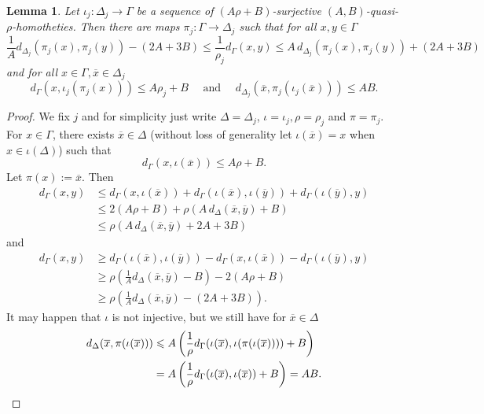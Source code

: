 \documentclass{amsart}
\newtheorem{lemma}[theorem]{Lemma}
\theoremstyle{definition}
\theoremstyle{remark}
\theoremstyle{remark}
\theoremstyle{definition}
\renewcommand{\leq}{\leqslant}
\renewcommand{\geq}{\geqslant}
\begin{document}
\begin{lemma} \label{lem:quasi-homothety-seq}
    Let $\iota_j \colon \Delta_j \to \Gamma$ be a sequence of $(A\rho+B)$-surjective $(A,B)$-quasi-$\rho$-homotheties. Then there are maps $\pi_j \colon \Gamma \to \Delta_j $ such that for all $x,y \in \Gamma$
     $$
    \frac{1}{A} d_{\Delta_j}(\pi_j(x),\pi_j(y)) - (2A+3B) \leq \frac{1}{\rho_j} d_{\Gamma}(x,y) \leq A\, d_{\Delta_j}(\pi_j(x),\pi_j(y)) + (2A + 3B)
    $$
    and for all $x\in \Gamma , \overline{x} \in \Delta_j$
    $$
    d_{\Gamma}(x,\iota_j(\pi_j(x))) \leq A\rho_j+ B  \quad \text{ and } \quad d_{\Delta_j}(\overline{x}, \pi_j(\iota_j(\overline{x}))) \leq AB.
    $$
\end{lemma}
\begin{proof}
    We fix $j$ and for simplicity just write $\Delta=\Delta_j$, $\iota = \iota_j, \rho = \rho_j$ and $\pi = \pi_j$. For $x \in \Gamma$, there exists $\overline{x} \in \Delta$ (without loss of generality let $\iota(\overline{x}) = x$ when $x \in \iota(\Delta)$) such that 
    $$
    d_{\Gamma}(x, \iota(\overline{x})) \leq A\rho +B.
    $$
    Let $\pi(x) := \overline{x}$. Then
    \begin{align*}
    d_{\Gamma}(x,y) & \leq d_{\Gamma}(x, \iota(\overline{x})) + d_{\Gamma}(\iota(\overline{x}), \iota(\overline{y})) + d_{\Gamma}(\iota(\overline{y}), y) \\
    & \leq 2(A\rho + B) + \rho( A\, d_{\Delta}(\overline{x}, \overline{y}) + B ) \\
    & \leq \rho ( A \, d_{\Delta}(\overline{x}, \overline{y}) + 2A + 3B )
    \end{align*}
    and
    \begin{align*}
        d_{\Gamma}(x,y) & \geq  d_{\Gamma}(\iota(\overline{x}), \iota(\overline{y})) - d_{\Gamma}(x, \iota(\overline{x})) - d_{\Gamma}(\iota(\overline{y}), y) \\
        & \geq \rho \left(\frac{1}{A}d_{\Delta}(\overline{x}, \overline{y}) - B\right) - 2(A \rho + B) \\
        & \geq \rho\left(  \frac{1}{A}d_{\Delta}(\overline{x}, \overline{y}) - (2A + 3B) \right) .
    \end{align*}
    It may happen that $\iota$ is not injective, but we still have for $\overline{x} \in \Delta$
    \begin{align*}
        d_{\Delta}(\overline{x} , \pi(\iota(\overline{x} )))
        & \leq  A\left( \frac{1}{\rho} d_{\Gamma}(\iota(\overline{x} ), \iota(\pi(\iota(\overline{x} )) )) + B \right)  \\
        &= A\left( \frac{1}{\rho} d_{\Gamma}(\iota(\overline{x} ), \iota(\overline{x}  )) + B \right) = AB. \qedhere
    \end{align*}
\end{proof}
\end{document}
